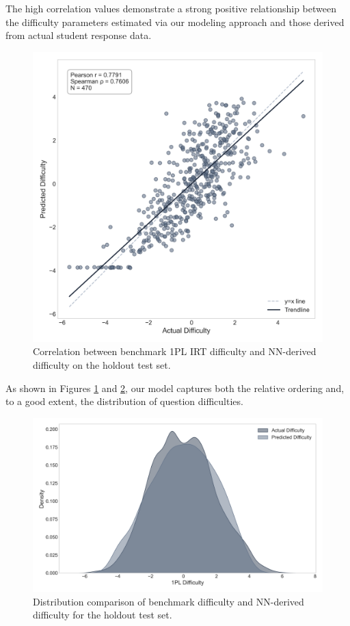 \documentclass[
    a4paper, %
    10pt, %
    twoside, %
]{LTJournalArticle}
\begin{document}
The high correlation values demonstrate a strong positive relationship between the difficulty parameters estimated via our modeling approach and those derived from actual student response data.

\begin{figure}[H]
    \centering
    \includegraphics[width=0.8\columnwidth]{figures/difficulty_scatter_Model_4_Full.png} 
    \caption{Correlation between benchmark 1PL IRT difficulty and NN-derived  difficulty on the holdout test set.}
    \label{fig:difficulty-correlation-1pl}
\end{figure}

As shown in Figures \ref{fig:difficulty-correlation-1pl} and \ref{fig:difficulty-distribution-1pl}, our model captures both the relative ordering and, to a good extent, the distribution of question difficulties.

\begin{figure}[H]
    \centering
    \includegraphics[width=0.8\columnwidth]{figures/difficulty_density_Model_4_Full.png} 
    \caption{Distribution comparison of benchmark difficulty and NN-derived difficulty for the holdout test set.}
    \label{fig:difficulty-distribution-1pl}
\end{figure}
\end{document}

